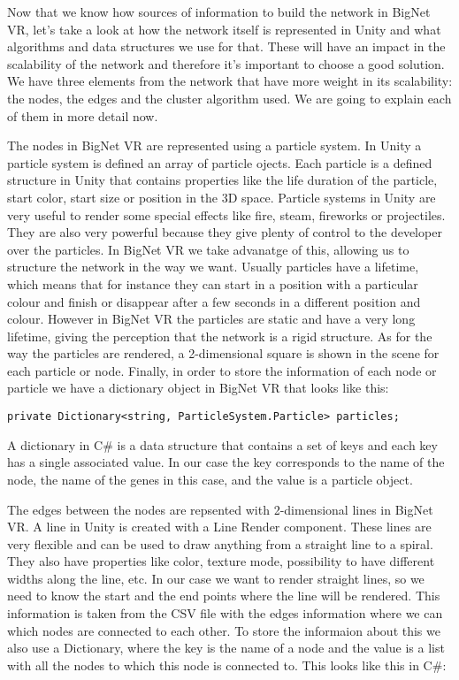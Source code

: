 Now that we know how sources of information to build the network in BigNet VR, let's take a look at how the network itself is represented in Unity and what algorithms and data structures we use for that. These will have an impact in the scalability of the network and therefore it's important to choose a good solution. We have three elements from the network that have more weight in its scalability: the nodes, the edges and the cluster algorithm used. We are going to explain each of them in more detail now.

The nodes in BigNet VR are represented using a particle system. In Unity a particle system\cite{particle_system} is defined an array of particle ojects. Each particle is a defined structure in Unity that contains properties like the life duration of the particle, start color, start size or position in the 3D space. Particle systems in Unity are very useful to render some special effects like fire, steam, fireworks or projectiles. They are also very powerful because they give plenty of control to the developer over the particles. In BigNet VR we take advanatge of this, allowing us to structure the network in the way we want. Usually particles have a lifetime, which means that for instance they can start in a position with a particular colour and finish or disappear after a few seconds in a different position and colour. However in BigNet VR the particles are static and have a very long lifetime, giving the perception that the network is a rigid structure. As for the way the particles are rendered, a 2-dimensional square is shown in the scene for each particle or node. Finally, in order to store the information of each node or particle we have a dictionary object in BigNet VR that looks like this:

\begin{verbatim}
private Dictionary<string, ParticleSystem.Particle> particles;
\end{verbatim}

A dictionary in C\# is a data structure that contains a set of keys and each key has a single associated value. In our case the key corresponds to the name of the node, the name of the genes in this case, and the value is a particle object.

The edges between the nodes are repsented with 2-dimensional lines in BigNet VR. A line in Unity is created with a Line Render component\cite{line_render}. These lines are very flexible and can be used to draw anything from a straight line to a spiral. They also have properties like color, texture mode, possibility to have different widths along the line, etc. In our case we want to render straight lines, so we need to know the start and the end points where the line will be rendered. This information is taken from the CSV file with the edges information where we can which nodes are connected to each other. To store the informaion about this we also use a Dictionary, where the key is the name of a node and the value is a list with all the nodes to which this node is connected to. This looks like this in C\#:

